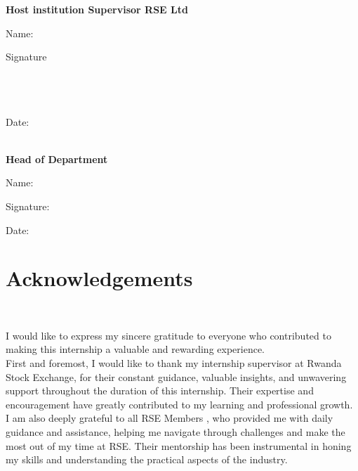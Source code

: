 \documentclass{article}
\begin{document}
\begin{titlepage}
\begin{titlepage}
\vspace{0.6cm}
\begin{flushleft}
    

\textbf{Host institution Supervisor  RSE Ltd}
\vspace{0.5cm}

Name:
\vspace{0.5cm}

Signature 
\\
\\
\\
\\

\vspace{1cm}

Date: 
\\
\\
\vspace{1cm}


\textbf{Head of Department}
\vspace{0.5cm}

Name:
\vspace{0.5cm}

Signature:
\vspace{0.5cm}

Date:

\end{flushleft}
\end{titlepage}


\begin{minipage}{15.6cm}

\section*{\textbf{\huge{Acknowledgements}}}
\\


\Large


I would like to express my sincere gratitude to everyone who contributed to making this internship a valuable and rewarding experience.\\

First and foremost, I would like to thank  my internship supervisor at Rwanda Stock Exchange, for their constant guidance, valuable insights, and unwavering support throughout the duration of this internship. Their expertise and encouragement have greatly contributed to my learning and professional growth.\\

I am also deeply grateful to all RSE Members , who provided me with daily guidance and assistance, helping me navigate through challenges and make the most out of my time at RSE. Their mentorship has been instrumental in honing my skills and understanding the practical aspects of the industry.
\\


\end{minipage}
\end{titlepage}
\end{document}
